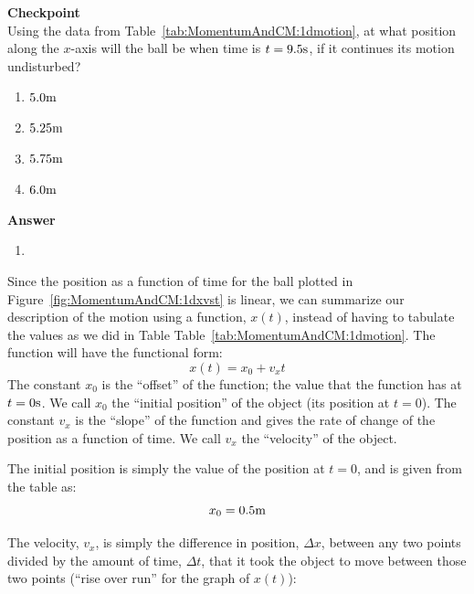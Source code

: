 \begin{framed}
\textbf{Checkpoint}\\
Using the data from Table~\ref{tab:MomentumAndCM:1dmotion}, at what position along the $x$-axis will the ball be when time is $t=9.5 {\rm s}$, if it continues its motion undisturbed?

\begin{enumerate}
\item $5.0 {\rm m}$
\item $5.25 {\rm m}$
\item $5.75 {\rm m}$
\item $6.0 {\rm m}$
\end{enumerate}

\begin{framed}
\textbf{Answer}\\
\begin{enumerate}[resume]
\item
\end{enumerate}
\end{framed}
\end{framed}

Since the position as a function of time for the ball plotted in Figure~\ref{fig:MomentumAndCM:1dxvst} is linear, we can summarize our description of the motion using a function, $x(t)$, instead of having to tabulate the values as we did in Table Table~\ref{tab:MomentumAndCM:1dmotion}. The function will have the functional form:
\begin{equation}
\label{eqn:MomentumAndCM:1dxvst_noa}
\boxed{x(t) = x_0 + v_x t}
\end{equation}
The constant $x_0$ is the ``offset'' of the function; the value that the function has at $t= 0 {\rm s}$. We call $x_0$ the ``initial position'' of the object (its position at $t=0$). The constant $v_x$ is the ``slope'' of the function and gives the rate of change of the position as a function of time. We call $v_x$ the ``velocity'' of the object.

The initial position is simply the value of the position at $t=0$, and is given from the table as:
\begin{equation}
x_0 = 0.5 {\rm m}
\end{equation}

The velocity, $v_x$, is simply the difference in position, $\Delta x$, between any two points divided by the amount of time, $\Delta t$, that it took the object to move between those two points (``rise over run'' for the graph of $x(t)$):

